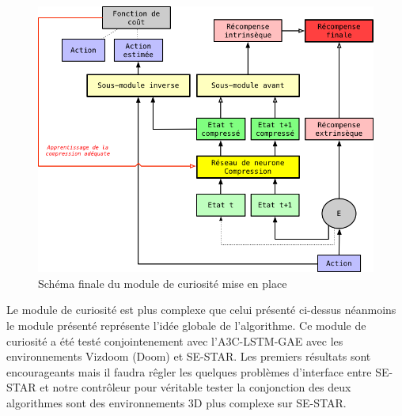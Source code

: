 \begin{figure}[h!]
    \begin{center}
        \includegraphics[scale=.4]{./assets/CURIOSITY/curiosity2.png}
        \caption{Schéma finale du module de curiosité mise en place}
    \end{center}
\end{figure}

Le module de curiosité est plus complexe que celui présenté ci-dessus néanmoins le module présenté représente l'idée globale de l'algorithme. Ce module de curiosité a été testé conjointenement avec l'A3C-LSTM-GAE avec les environnements Vizdoom (Doom) et SE-STAR. Les premiers résultats sont encourageants mais il faudra rêgler les quelques problèmes d'interface entre SE-STAR et notre contrôleur pour véritable tester la conjonction des deux algorithmes sont des environnements 3D plus complexe sur SE-STAR. 
